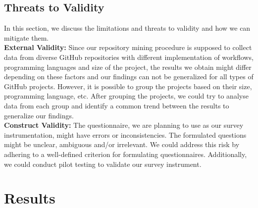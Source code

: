 \documentclass[conference]{IEEEtran}
\begin{document}
    \subsection{Threats to Validity}
        In this section, we discuss the limitations and threats to
        validity and how we can mitigate them.\\

        \textbf{External Validity:} Since our repository mining procedure is supposed to collect data from diverse GitHub repositories with different implementation of workflows, programming languages and size of the project, the results we obtain might differ depending on these factors and our findings can not be generalized for all types of GitHub projects. However, it is possible to group the projects based on their size, programming language, etc. After grouping the projects, we could try to analyse data from each group and identify a common trend between the results to generalize our findings.\\

	\textbf{Construct Validity:} The questionnaire, we are planning to use as our survey instrumentation, might have errors or inconsistencies. The formulated questions might be unclear, ambiguous and/or irrelevant. We could address this risk by adhering to a well-defined criterion for formulating questionnaires. Additionally, we could conduct pilot testing to validate our survey instrument.\\


\section{Results}
\end{document}
